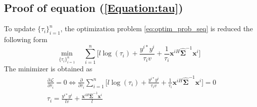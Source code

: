 \vspace{-0.7cm}
\subsection{Proof of equation (\ref{Equation:tau})} %
\noindent
To update $\{\tau_i\}_{i=1}^n$, the optimization problem \ref{eq:optim_prob_seq} is reduced the following form
\begin{equation*}
    \min_{\{\tau_i\}_{i=1}^n} \quad \sum_{i=1}^n \Bigg[ l \log(\tau_i) + \frac{y^{i*} y^i}{\tau_i v} + \frac{1}{\tau_i} \mathbf{x}^{iH} \hat{\mathbf{\Sigma}}^{-1} \mathbf{x}^i \Bigg]  %
\end{equation*}
The minimizer is obtained as 
\vspace{-0.8cm}
\begin{align*}
    &\frac{\partial \mathcal{L}}{\partial \tau_i} = 0 \Longleftrightarrow 
    \frac{\partial }{\partial \tau_i} \sum_{i=1}^n \Bigg[ l \log(\tau_i) + \frac{y^{i*} y^i}{\tau_i v} + \frac{1}{\tau_i} \mathbf{x}^{iH} \hat{\mathbf{\Sigma}}^{-1} \mathbf{x}^i \Bigg] = 0 \\
    &\tau_i = \frac{y^{i*} y^i}{l v} + \frac{\mathbf{x}^{iH} \hat{\mathbf{\Sigma}}^{-1} \mathbf{x}^i}{l}
\end{align*}
